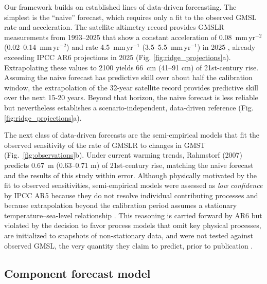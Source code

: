 \documentclass[12pt]{article}
\begin{document}
Our framework builds on established lines of data-driven forecasting. The simplest is the ``naive'' forecast, which requires only a fit to the observed GMSL rate and acceleration. The satellite altimetry record provides GMSLR measurements from 1993--2025 that show a constant acceleration of 0.08~mm\,yr$^{-2}$ (0.02--0.14~mm\,yr$^{-2}$) and rate 4.5~mm\,yr$^{-1}$ (3.5--5.5~mm\,yr$^{-1}$) in 2025 \citep{Hamlington2022, Hamlington2024}, already exceeding IPCC AR6 projections in 2025 (Fig. \ref{fig:ridge_projections}a). Extrapolating these values to 2100 yields 66~cm (41--91 cm) of 21st-century rise. Assuming the naive forecast has predictive skill over about half the calibration window, the extrapolation of the 32-year satellite record provides predictive skill over the next 15-20 years. Beyond that horizon, the naive forecast is less reliable but nevertheless establishes a scenario-independent, data-driven reference (Fig. \ref{fig:ridge_projections}a). 

The next class of data-driven forecasts are the semi-empirical models that fit the observed sensitivity of the rate of GMSLR to changes in GMST (Fig.~\ref{fig:observations}b). Under current warming trends, Rahmstorf (2007) \citep{Rahmstorf2007} predicts 0.67~m (0.63--0.71 m) of 21st-century rise, matching the naive forecast and the results of this study within error. Although physically motivated by the fit to observed sensitivities, semi-empirical models were assessed as \emph{low confidence} by IPCC AR5 because they do not resolve individual contributing processes and because extrapolation beyond the calibration period assumes a stationary temperature--sea-level relationship \citep{Church2013}. This reasoning is carried forward by AR6 but violated by the decision to favor process models that omit key physical processes, are initialized to snapshots of non-stationary data, and were not tested against observed GMSL, the very quantity they claim to predict, prior to publication \citep{Fox-Kemper2021}.  

\subsection*{Component forecast model}
\end{document}

